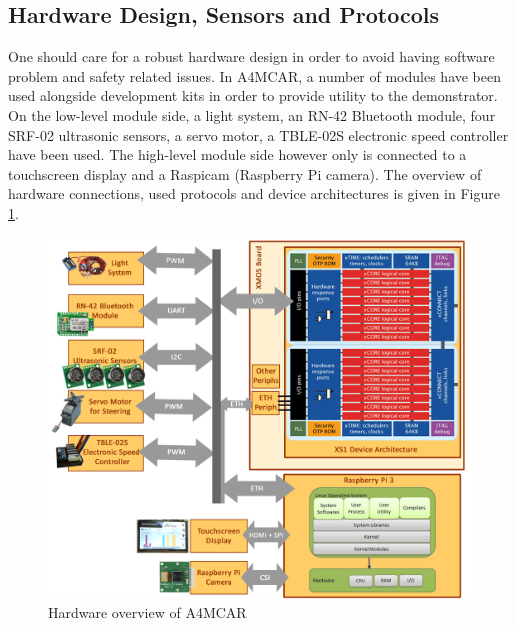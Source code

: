 \subsection{Hardware Design, Sensors and Protocols}
One should care for a robust hardware design in order to avoid having software problem and safety related issues. In A4MCAR, a number of modules have been used alongside development kits in order to provide utility to the demonstrator. On the low-level module side, a light system, an RN-42 Bluetooth module, four SRF-02 ultrasonic sensors, a servo motor, a TBLE-02S electronic speed controller have been used. The high-level module side however only is connected to a touchscreen display and a Raspicam (Raspberry Pi camera). The overview of hardware connections, used protocols and device architectures is given in Figure \ref{fig:hwoverview}.
\begin{figure}[!ht]
	\centering
	\captionsetup{justification=centering}
	\includegraphics[width=\textwidth]{content/images/hwoverview.png}
	\caption{Hardware overview of A4MCAR}
	\label{fig:hwoverview}
\end{figure}

